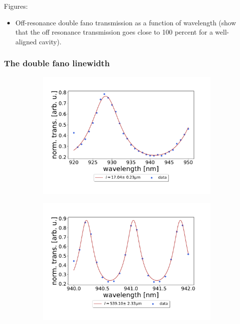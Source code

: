 Figures:
\begin{itemize}
    \item Off-resonance double fano transmission as a function of wavelength (show that the off resonance transmission goes close to 100 percent for a well-aligned cavity).
\end{itemize}

\subsubsection{The double fano linewidth}

\begin{figure}[h!]
    \centering
    \begin{subfigure}[b]{0.49\textwidth}
        \centering
        \includegraphics[width=\textwidth]{figures/results/double fano fits/30um_M3:M5_FSR_scan.pdf}
        \caption{}
        \label{fig:short_double_fano_FSR}
    \end{subfigure}
    \begin{subfigure}[b]{0.49\textwidth}
        \centering
        \includegraphics[width=\textwidth]{figures/results/double fano fits/550um_M3:M5_FSR_scan.pdf}
        \caption{}
        \label{fig:long_double_fano_FSR}
    \end{subfigure}
\end{figure}

